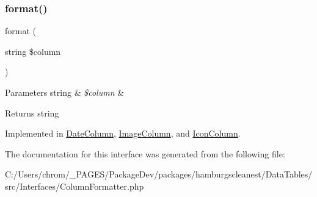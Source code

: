 \subsubsection{\texorpdfstring{format()}{format()}}
{\footnotesize\ttfamily format (\begin{DoxyParamCaption}\item[{string}]{\$column }\end{DoxyParamCaption})}


\begin{DoxyParams}[1]{Parameters}
string & {\em \$column} & \\
\hline
\end{DoxyParams}
\begin{DoxyReturn}{Returns}
string 
\end{DoxyReturn}


Implemented in \hyperlink{classhamburgscleanest_1_1_data_tables_1_1_models_1_1_column_formatters_1_1_date_column_aba259f7ae8b25e70bd444020c04606e7}{Date\+Column}, \hyperlink{classhamburgscleanest_1_1_data_tables_1_1_models_1_1_column_formatters_1_1_image_column_aba259f7ae8b25e70bd444020c04606e7}{Image\+Column}, and \hyperlink{classhamburgscleanest_1_1_data_tables_1_1_models_1_1_column_formatters_1_1_icon_column_aba259f7ae8b25e70bd444020c04606e7}{Icon\+Column}.



The documentation for this interface was generated from the following file\+:\begin{DoxyCompactItemize}
\item 
C\+:/\+Users/chrom/\+\_\+\+P\+A\+G\+E\+S/\+Package\+Dev/packages/hamburgscleanest/\+Data\+Tables/src/\+Interfaces/Column\+Formatter.\+php\end{DoxyCompactItemize}
